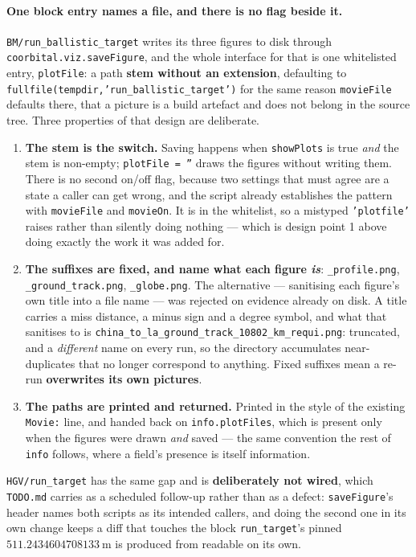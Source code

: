 \documentclass[11pt]{article}
\newcommand{\code}[1]{\texttt{#1}}
\begin{document}
\paragraph{One block entry names a file, and there is no flag beside it.}
\code{BM/run\_ballistic\_target} writes its three figures to disk through
\code{coorbital.viz.saveFigure}, and the whole interface for that is one
whitelisted entry, \code{plotFile}: a path \textbf{stem without an extension},
defaulting to \code{fullfile(tempdir,'run\_ballistic\_target')} for the same
reason \code{movieFile} defaults there, that a picture is a build artefact and
does not belong in the source tree. Three properties of that design are
deliberate.

\begin{enumerate}
\item \textbf{The stem is the switch.} Saving happens when \code{showPlots} is
true \emph{and} the stem is non-empty; \code{plotFile = ''} draws the figures
without writing them. There is no second on/off flag, because two settings that
must agree are a state a caller can get wrong, and the script already
establishes the pattern with \code{movieFile} and \code{movieOn}. It is in the
whitelist, so a mistyped \code{'plotfile'} raises rather than silently doing
nothing --- which is design point 1 above doing exactly the work it was added
for.
\item \textbf{The suffixes are fixed, and name what each figure \emph{is}}:
\code{\_profile.png}, \code{\_ground\_track.png}, \code{\_globe.png}. The
alternative --- sanitising each figure's own title into a file name --- was
rejected on evidence already on disk. A title carries a miss distance, a minus
sign and a degree symbol, and what that sanitises to is
\code{china\_to\_la\_ground\_track\_10802\_km\_requi.png}: truncated, and a
\emph{different} name on every run, so the directory accumulates near-duplicates
that no longer correspond to anything. Fixed suffixes mean a re-run
\textbf{overwrites its own pictures}.
\item \textbf{The paths are printed and returned.} Printed in the style of the
existing \code{Movie:} line, and handed back on \code{info.plotFiles}, which is
present only when the figures were drawn \emph{and} saved --- the same
convention the rest of \code{info} follows, where a field's presence is itself
information.
\end{enumerate}

\code{HGV/run\_target} has the same gap and is \textbf{deliberately not wired},
which \code{TODO.md} carries as a scheduled follow-up rather than as a defect:
\code{saveFigure}'s header names both scripts as its intended callers, and doing
the second one in its own change keeps a diff that touches the block
\code{run\_target}'s pinned $511.2434604708133~\mathrm{m}$ is produced from
readable on its own.
\end{document}
